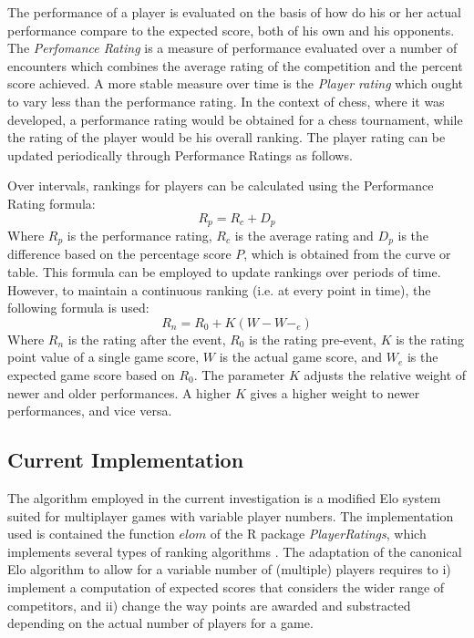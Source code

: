 The performance of a player is evaluated on the basis of how do his or her actual performance compare to the expected score, both of his own and his opponents. The \textit{Perfomance Rating} is a measure of performance evaluated over a number of encounters which combines the average rating of the competition and the percent score achieved. A more stable measure over time is the \textit{Player rating} which ought to vary less than the performance rating. In the context of chess, where it was developed, a performance rating would be obtained for a chess tournament, while the rating of the player would be his overall ranking. The player rating can be updated periodically through Performance Ratings as follows.

Over intervals, rankings for players can be calculated using the Performance Rating formula:
\begin{equation}
  R_p=R_c+D_p
  \label{ratingdiscrete}
\end{equation}
Where $R_p$ is the performance rating, $R_c$ is the average rating and $D_p$ is the difference based on the percentage score $P$, which is obtained from the curve or table. This formula can be employed to update rankings over periods of time. However, to maintain a continuous ranking (i.e. at every point in time), the following formula is used:
\begin{equation}
  R_n=R_0 + K(W-W-_e)
  \label{ratingcontinuous}
\end{equation}
Where $R_n$ is the rating after the event, $R_0$ is the rating pre-event, $K$ is the rating point value of a single game score, $W$ is the actual game score, and $W_e$ is the expected game score based on $R_0$. The parameter $K$ adjusts the relative weight of newer and older performances. A higher $K$ gives a higher weight to newer performances, and vice versa.

\subsection{Current Implementation}
The algorithm employed in the current investigation is a modified  Elo system suited for multiplayer games with variable player numbers. The implementation used is contained the function $elom$ of the R package \textit{PlayerRatings}, which implements several types of ranking algorithms \citep{stephenson2020package}. The adaptation of the canonical Elo algorithm to allow for a variable number of (multiple) players requires to i) implement a computation of expected scores that considers the wider range of competitors, and ii) change the way points are awarded and substracted depending on the actual number of players for a game.

